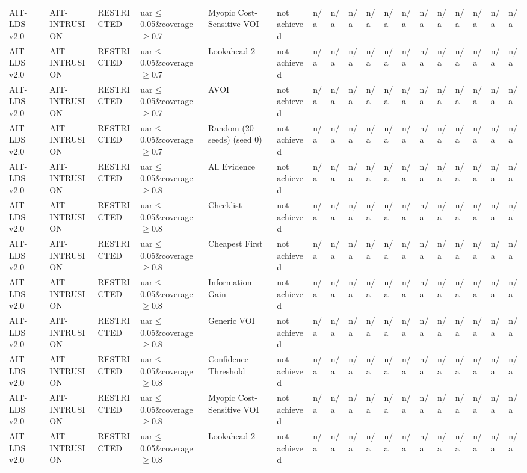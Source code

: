 \begin{table}[!ht]
{\begin{tabular}{llllllllllllllllll}
AIT-LDS v2.0 & AIT-INTRUSION & RESTRICTED & uar$\le$0.05\&coverage$\ge$0.7 & Myopic Cost-Sensitive VOI & not achieved & n/a & n/a & n/a & n/a & n/a & n/a & n/a & n/a & n/a & n/a & n/a & n/a \\
AIT-LDS v2.0 & AIT-INTRUSION & RESTRICTED & uar$\le$0.05\&coverage$\ge$0.7 & Lookahead-2 & not achieved & n/a & n/a & n/a & n/a & n/a & n/a & n/a & n/a & n/a & n/a & n/a & n/a \\
AIT-LDS v2.0 & AIT-INTRUSION & RESTRICTED & uar$\le$0.05\&coverage$\ge$0.7 & AVOI & not achieved & n/a & n/a & n/a & n/a & n/a & n/a & n/a & n/a & n/a & n/a & n/a & n/a \\
AIT-LDS v2.0 & AIT-INTRUSION & RESTRICTED & uar$\le$0.05\&coverage$\ge$0.7 & Random (20 seeds) (seed 0) & not achieved & n/a & n/a & n/a & n/a & n/a & n/a & n/a & n/a & n/a & n/a & n/a & n/a \\
AIT-LDS v2.0 & AIT-INTRUSION & RESTRICTED & uar$\le$0.05\&coverage$\ge$0.8 & All Evidence & not achieved & n/a & n/a & n/a & n/a & n/a & n/a & n/a & n/a & n/a & n/a & n/a & n/a \\
AIT-LDS v2.0 & AIT-INTRUSION & RESTRICTED & uar$\le$0.05\&coverage$\ge$0.8 & Checklist & not achieved & n/a & n/a & n/a & n/a & n/a & n/a & n/a & n/a & n/a & n/a & n/a & n/a \\
AIT-LDS v2.0 & AIT-INTRUSION & RESTRICTED & uar$\le$0.05\&coverage$\ge$0.8 & Cheapest First & not achieved & n/a & n/a & n/a & n/a & n/a & n/a & n/a & n/a & n/a & n/a & n/a & n/a \\
AIT-LDS v2.0 & AIT-INTRUSION & RESTRICTED & uar$\le$0.05\&coverage$\ge$0.8 & Information Gain & not achieved & n/a & n/a & n/a & n/a & n/a & n/a & n/a & n/a & n/a & n/a & n/a & n/a \\
AIT-LDS v2.0 & AIT-INTRUSION & RESTRICTED & uar$\le$0.05\&coverage$\ge$0.8 & Generic VOI & not achieved & n/a & n/a & n/a & n/a & n/a & n/a & n/a & n/a & n/a & n/a & n/a & n/a \\
AIT-LDS v2.0 & AIT-INTRUSION & RESTRICTED & uar$\le$0.05\&coverage$\ge$0.8 & Confidence Threshold & not achieved & n/a & n/a & n/a & n/a & n/a & n/a & n/a & n/a & n/a & n/a & n/a & n/a \\
AIT-LDS v2.0 & AIT-INTRUSION & RESTRICTED & uar$\le$0.05\&coverage$\ge$0.8 & Myopic Cost-Sensitive VOI & not achieved & n/a & n/a & n/a & n/a & n/a & n/a & n/a & n/a & n/a & n/a & n/a & n/a \\
AIT-LDS v2.0 & AIT-INTRUSION & RESTRICTED & uar$\le$0.05\&coverage$\ge$0.8 & Lookahead-2 & not achieved & n/a & n/a & n/a & n/a & n/a & n/a & n/a & n/a & n/a & n/a & n/a & n/a \\

\end{tabular}}
\end{table}
